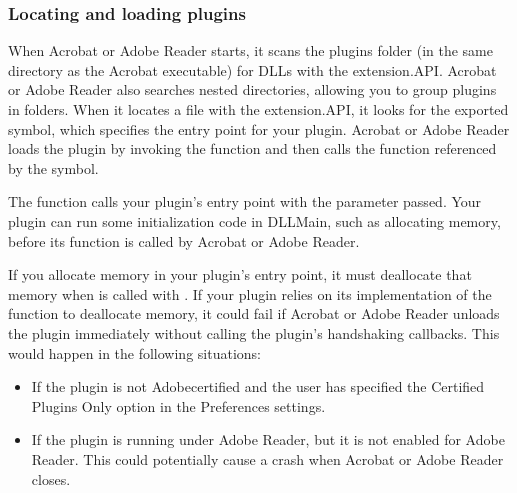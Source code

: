 \documentclass[letterpaper,12pt,english,openany,oneside]{sphinxmanual}
\begin{document}
\subsubsection{Locating and loading plugins}
\label{\detokenize{Plugins_CreatingSimplePlug:locating-and-loading-plugins}}
When Acrobat or Adobe Reader starts, it scans the plugins folder (in the same directory as the Acrobat executable) for DLLs with the extension.API. Acrobat or Adobe Reader also searches nested directories, allowing you to group plugins in folders. When it locates a file with the extension.API, it looks for the  exported symbol, which specifies the entry point for your plugin. Acrobat or Adobe Reader loads the plugin by invoking the  function and then calls the function referenced by the  symbol.

The  function calls your plugin’s  entry point with the parameter  passed. Your plugin can run some initialization code in DLLMain, such as allocating memory, before its  function is called by Acrobat or Adobe Reader.

If you allocate memory in your plugin’s  entry point, it must deallocate that memory when  is called with . If your plugin relies on its implementation of the  function to deallocate memory, it could fail if Acrobat or Adobe Reader unloads the plugin immediately without calling the plugin’s handshaking callbacks. This would happen in the following situations:
\begin{itemize}
\item {} 
If the plugin is not Adobe\sphinxhyphen{}certified and the user has specified the Certified Plugins Only option in the Preferences settings.

\item {} 
If the plugin is running under Adobe Reader, but it is not enabled for Adobe Reader. This could potentially cause a crash when Acrobat or Adobe Reader closes.

\end{itemize}
\end{document}
